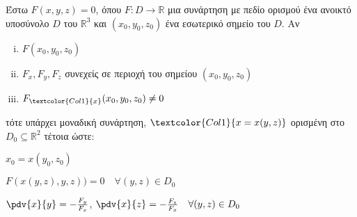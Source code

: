     Έστω $ F(x,y,z) = 0 $, όπου $F\colon D \to \mathbb{R}$ μια συνάρτηση με πεδίο ορισμού 
    ένα ανοικτό υποσύνολο $ D $ του $ \mathbb{R}^{3}  $ και $ (x_0,y_0,z_0) $ ένα 
    εσωτερικό σημείο του $ D $. Αν
    \begin{enumerate}[(i)]
      \item $ F(x_0,y_0,z_0) $
      \item $ F_x, F_y, F_z $ συνεχείς σε περιοχή του σημείου $ (x_0,y_0,z_0) $
      \item $ F_{\textcolor{Col1}{x}}(x_0,y_0,z_0) \neq 0 $
    \end{enumerate}
    τότε υπάρχει μοναδική συνάρτηση, $ \textcolor{Col1}{x=x(y,z)} $ ορισμένη στο 
    $ D_0 \subseteq \mathbb{R}^{2} $ τέτοια ώστε:
    \begin{myitemize}
      \item $ x_0 = x(y_0,z_0) $
      \item $ F(x(y,z),y,z)) = 0  \quad \forall (y,z) \in  D_0 $
      \item $ \pdv{x}{y} = - \frac{F_y}{F_x} $, $ \pdv{x}{z} = - \frac{F_z}{F_x}\quad 
        \forall (y,z) \in D_0$
    \end{myitemize}

